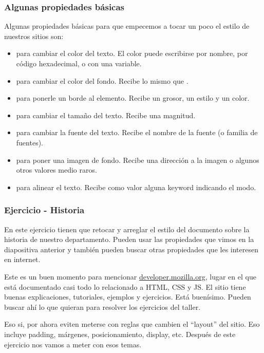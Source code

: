 \begin{frame}[fragile]
    \frametitle{Algunas propiedades básicas}
    
    Algunas propiedades básicas para que empecemos a tocar un poco el estilo 
    de nuestros sitios son:

    \begin{itemize}
        \item {} para cambiar el color del texto. El color puede 
              escribirse por nombre, por código hexadecimal, o con una variable.
        \item {} para cambiar el color del fondo. Recibe 
              lo mismo que .
        \item {} para ponerle un borde al elemento. Recibe un grosor, 
              un estilo y un color.
        \item {} para cambiar el tamaño del texto. Recibe una 
              magnitud.
        \item {} para cambiar la fuente del texto. Recibe el 
              nombre de la fuente (o familia de fuentes).
        \item {} para poner una imagen de fondo. Recibe 
              una dirección a la imagen o algunos otros valores medio raros.
        \item {} para alinear el texto. Recibe como 
              valor alguna keyword indicando el modo.
    \end{itemize}

\end{frame}

\begin{frame}[fragile]
    \frametitle{Ejercicio - Historia}
    
    En este ejercicio tienen que retocar y arreglar el estilo del documento 
    sobre la historia de nuestro departamento. Pueden usar las propiedades que vimos 
    en la diapositiva anterior y también pueden buscar otras propiedades que 
    les interesen en internet.

    Este es un buen momento para mencionar 
    \href{https://developer.mozilla.org/}{developer.mozilla.org}, lugar en el que 
    está documentado casi todo lo relacionado a HTML, CSS y JS. El sitio tiene 
    buenas explicaciones, tutoriales, ejemplos y ejercicios. Está buenísimo.
    Pueden buscar ahí lo que quieran para resolver los ejercicios del taller.

    Eso si, por ahora eviten meterse con reglas que cambien el ``layout'' del sitio. 
    Eso incluye padding, márgenes, posicionamiento, display, etc. Después de este 
    ejercicio nos vamos a meter con esos temas.

\end{frame}
